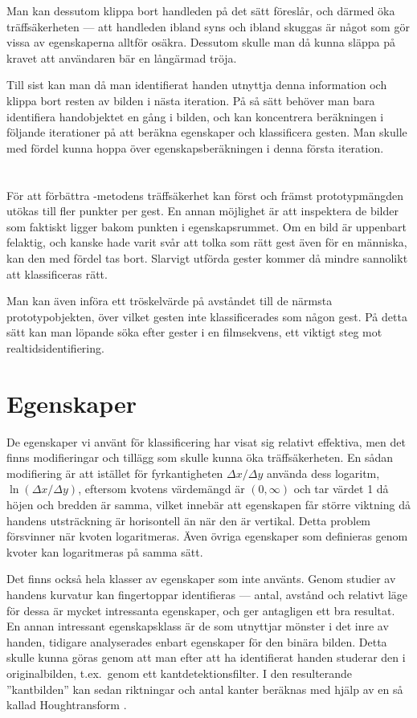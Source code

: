 \documentclass[../rapport_MVEX01-11-05]{subfiles}
\begin{document}
Man kan dessutom klippa bort handleden på det sätt
 föreslår, och därmed öka träffsäkerheten --- att
handleden ibland syns och ibland skuggas är något som gör vissa av 
egenskaperna alltför osäkra. Dessutom skulle man då kunna släppa på kravet
att användaren bär en långärmad tröja.

Till sist kan man då man identifierat handen utnyttja denna information och
klippa bort resten av bilden i nästa iteration. På så sätt behöver man bara
identifiera handobjektet en gång i bilden, och kan koncentrera beräkningen
i följande iterationer på att beräkna egenskaper och klassificera gesten.
Man skulle med fördel kunna hoppa över egenskapsberäkningen i denna första
iteration.

\section{\knn}
För att förbättra \knn-metodens träffsäkerhet kan först och
främst prototypmängden utökas till fler punkter per gest. En annan
möjlighet är att inspektera de bilder som faktiskt ligger bakom
punkten i egenskapsrummet. Om en bild är uppenbart felaktig, och kanske hade varit
svår att tolka som rätt gest även för en människa, kan den med fördel tas bort.
Slarvigt utförda gester kommer då mindre sannolikt att
klassificeras rätt.

Man kan även införa ett tröskelvärde på avståndet till de närmsta
prototypobjekten, över vilket gesten inte klassificerades som någon
gest. På detta sätt kan man löpande söka efter gester
i en filmsekvens, ett viktigt steg mot
realtidsidentifiering.

\section{Egenskaper}
De egenskaper vi använt för klassificering har visat sig relativt
effektiva, men det finns modifieringar och tillägg som skulle kunna
öka träffsäkerheten.
En sådan modifiering är att istället för fyrkantigheten $\Delta
x/\Delta y$ använda dess logaritm, $\ln(\Delta x/\Delta
y)$, eftersom kvotens värdemängd är $(0,\infty)$ och tar värdet 1 då
höjen och bredden är samma, vilket innebär att egenskapen får större
viktning då handens utsträckning är horisontell än när den är vertikal. Detta problem
försvinner när kvoten logaritmeras. Även övriga egenskaper som
definieras genom kvoter kan logaritmeras på samma sätt.

Det finns också hela klasser av egenskaper som inte använts.
Genom studier av handens kurvatur kan fingertoppar 
identifieras --- antal, avstånd och relativt läge för dessa är
mycket intressanta egenskaper, och ger antagligen ett bra resultat.
En annan intressant egenskapsklass är de som utnyttjar mönster i det
inre av handen, tidigare analyserades enbart egenskaper för den binära bilden.
Detta skulle kunna göras
genom att man efter att ha identifierat handen studerar den
i originalbilden, t.ex.~genom ett kantdetektionsfilter.
I den resulterande ''kantbilden'' kan sedan riktningar och antal kanter
beräknas med hjälp av en så kallad Houghtransform \cite{Duda72}.
\end{document}
